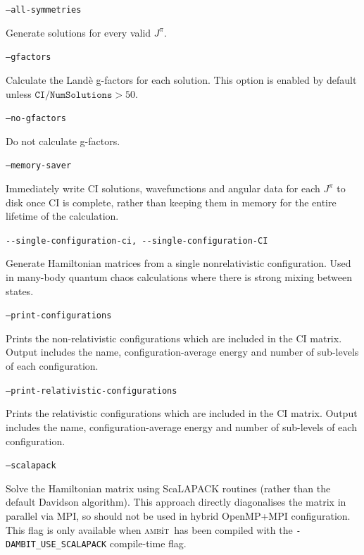 \documentclass{report}
\newcommand{\ambit}{\textsc{amb}{\footnotesize i}\textsc{t}}
\begin{document}
\texttt{--all-symmetries} 
\begin{adjustwidth}{1cm}{}
Generate solutions for every valid $J^{\pi}$.
\end{adjustwidth}

\texttt{--gfactors} 
\begin{adjustwidth}{1cm}{}
Calculate the Land\`{e} g-factors for each solution. This option is enabled by default unless 
$\texttt{CI/NumSolutions} > 50$.
\end{adjustwidth}

\texttt{--no-gfactors} 
\begin{adjustwidth}{1cm}{}
Do not calculate g-factors.
\end{adjustwidth}

\texttt{--memory-saver}
\begin{adjustwidth}{1cm}{}
Immediately write CI solutions, wavefunctions and angular data for each $J^{\pi}$ to disk once CI is 
complete, rather than keeping them in memory for the entire lifetime of the calculation. 
\end{adjustwidth}

\texttt{{-}{-}single-configuration-ci, {-}{-}single-configuration-CI}
\begin{adjustwidth}{1cm}{}
Generate Hamiltonian matrices from a single nonrelativistic configuration. Used in many-body quantum
chaos calculations where there is strong mixing between states.
\end{adjustwidth}

\texttt{--print-configurations}
\begin{adjustwidth}{1cm}{}
Prints the non-relativistic configurations which are included in the CI matrix.
Output includes the name, configuration-average energy and number of sub-levels of each configuration.
\end{adjustwidth}

\texttt{--print-relativistic-configurations}
\begin{adjustwidth}{1cm}{}
Prints the relativistic configurations which are included in the CI matrix.
Output includes the name, configuration-average energy and number of sub-levels of each configuration.
\end{adjustwidth}

\texttt{--scalapack}
\begin{adjustwidth}{1cm}{}
Solve the Hamiltonian matrix using ScaLAPACK routines (rather than the default Davidson algorithm). 
This approach directly diagonalises the matrix in parallel via MPI, so should not be used in hybrid
OpenMP+MPI configuration. This flag is only available when \ambit\ has been compiled with the
\texttt{-DAMBIT\_USE\_SCALAPACK} compile-time flag.
\end{adjustwidth}
\end{document}
